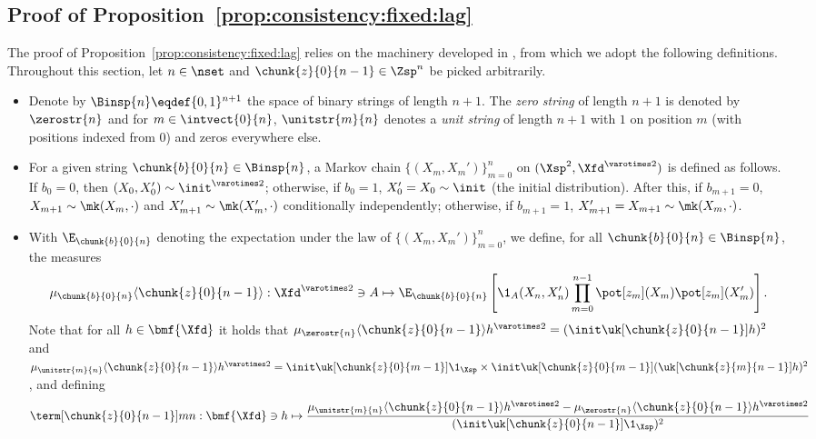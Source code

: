 \subsection{Proof of Proposition~\ref{prop:consistency:fixed:lag}}
\label{sec:proof:consistency:fixed:lag}

The proof of Proposition~\ref{prop:consistency:fixed:lag} relies on the machinery developed in \cite{lee:whiteley:2016}, from which we adopt the following definitions. Throughout this section, 
let $n \in \nset$ and $\chunk{z}{0}{n - 1} \in \Zsp^n$ be picked arbitrarily.  
\begin{itemize}
\item Denote by $\Binsp{n} \eqdef \{0, 1\}^{n + 1}$ the space of binary strings of length $n + 1$. The \emph{zero string} of length $n + 1$ is denoted by $\zerostr{n}$ and for $m \in \intvect{0}{n}$, $\unitstr{m}{n}$ denotes a \emph{unit string} of length $n + 1$ with $1$ on position $m$ (with positions indexed from $0$) and zeros everywhere else.  
\item For a given string $\chunk{b}{0}{n} \in \Binsp{n}$, a Markov chain $\{(X_m, X_m') \}_{m = 0}^n$ on $(\Xsp^2, \Xfd^{\varotimes 2})$ is defined as follows. If $b_0 = 0$, then $(X_0, X_0') \sim \init^{\varotimes 2}$; otherwise, if $b_0 = 1$, $X_0' = X_0 \sim \init$ (the initial distribution). After this, if $b_{m + 1} = 0$, $X_{m + 1} \sim \mk(X_m, \cdot)$ and $X_{m + 1}' \sim \mk(X_m', \cdot)$ conditionally independently; otherwise, if $b_{m + 1} = 1$, $X_{m + 1}' = X_{m + 1} \sim \mk(X_m, \cdot)$. 
\item With $\E_{\chunk{b}{0}{n}}$ denoting the expectation under the law of $\{(X_m, X_m') \}_{m = 0}^n$, we define, for all $\chunk{b}{0}{n} \in \Binsp{n}$, the measures 
$$
\mu_{\chunk{b}{0}{n}} \langle \chunk{z}{0}{n - 1} \rangle : \Xfd^{\varotimes 2} \ni A \mapsto 
\E_{\chunk{b}{0}{n}} \left[ \1_A(X_n, X_n') \prod_{m = 0}^{n - 1} \pot[z_m](X_m) \pot[z_m](X_m') \right]. 
$$ 
Note that for all $h \in \bmf{\Xfd}$ it holds that $\mu_{\zerostr{n}} \langle \chunk{z}{0}{n - 1} \rangle h^{\varotimes 2} = (\init \uk[ \chunk{z}{0}{n - 1}] h)^2$ and $\mu_{\unitstr{m}{n}} \langle \chunk{z}{0}{n - 1} \rangle h^{\varotimes 2} = \init \uk[\chunk{z}{0}{m - 1}] \1_\Xsp \times \init \uk[\chunk{z}{0}{m - 1}](\uk[\chunk{z}{m}{n - 1}] h)^2$, and defining 
$$
\term[\chunk{z}{0}{n - 1}]{m}{n} : \bmf{\Xfd} \ni h \mapsto \frac{\mu_{\unitstr{m}{n}} \langle \chunk{z}{0}{n - 1} \rangle h^{\varotimes 2} - \mu_{\zerostr{n}} \langle \chunk{z}{0}{n - 1} \rangle h^{\varotimes 2}}{(\init \uk[\chunk{z}{0}{n - 1}] \1_\Xsp)^2}
$$
\end{itemize}
